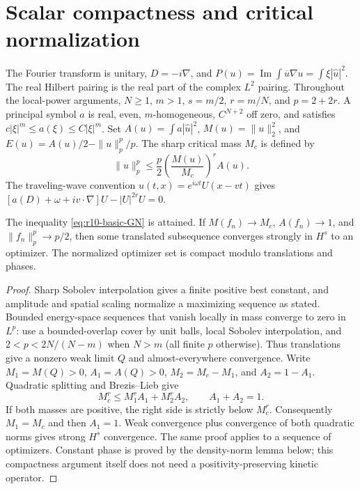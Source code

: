 \section{Scalar compactness and critical normalization}
\label{sec:r10-foundations}
The Fourier transform is unitary, $D=-i\nabla$, and
$P(u)=\operatorname{Im}\int\overline u\nabla u=\int\xi|\widehat u|^2$.
The real Hilbert pairing is the real part of the complex $L^2$ pairing.
Throughout the local-power arguments, $N\ge1$, $m>1$, $s=m/2$,
$r=m/N$, and $p=2+2r$. A principal symbol $a$ is real, even,
$m$-homogeneous, $C^{N+2}$ off zero, and satisfies
$c|\xi|^m\le a(\xi)\le C|\xi|^m$.
Set $A(u)=\int a|\widehat u|^2$, $M(u)=\|u\|_2^2$, and
$E(u)=A(u)/2-\|u\|_p^p/p$. The sharp critical mass $M_c$ is defined by
\begin{equation}\label{eq:r10-basic-GN}
 \|u\|_p^p\le\frac p2\left(\frac{M(u)}{M_c}\right)^r A(u).
\end{equation}
The traveling-wave convention $u(t,x)=e^{i\omega t}U(x-vt)$ gives
$[a(D)+\omega+iv\cdot\nabla]U-|U|^{2r}U=0$.

\begin{lemma}
The inequality \eqref{eq:r10-basic-GN} is attained. If
$M(f_n)\to M_c$, $A(f_n)\to1$, and $\|f_n\|_p^p\to p/2$, then
some translated subsequence converges strongly in $H^s$ to an optimizer.
The normalized optimizer set is compact modulo translations and phases.
\end{lemma}
\begin{proof}
Sharp Sobolev interpolation gives a finite positive best constant, and
amplitude and spatial scaling normalize a maximizing sequence as stated.
Bounded energy-space sequences that vanish locally in mass converge to
zero in $L^p$: use a bounded-overlap cover by unit balls, local Sobolev
interpolation, and $2<p<2N/(N-m)$ when $N>m$ (all finite $p$ otherwise).
Thus translations give a nonzero weak limit $Q$ and almost-everywhere
convergence. Write $M_1=M(Q)>0$, $A_1=A(Q)>0$, $M_2=M_c-M_1$,
and $A_2=1-A_1$. Quadratic splitting and Brezis--Lieb give
\[
 M_c^r\le M_1^r A_1+M_2^r A_2,\qquad A_1+A_2=1.
\]
If both masses are positive, the right side is strictly below $M_c^r$.
Consequently $M_1=M_c$ and then $A_1=1$. Weak convergence plus
convergence of both quadratic norms gives strong $H^s$ convergence.
The same proof applies to a sequence of optimizers. Constant phase is
proved by the density-norm lemma below; this compactness argument itself
does not need a positivity-preserving kinetic operator.
\end{proof}

